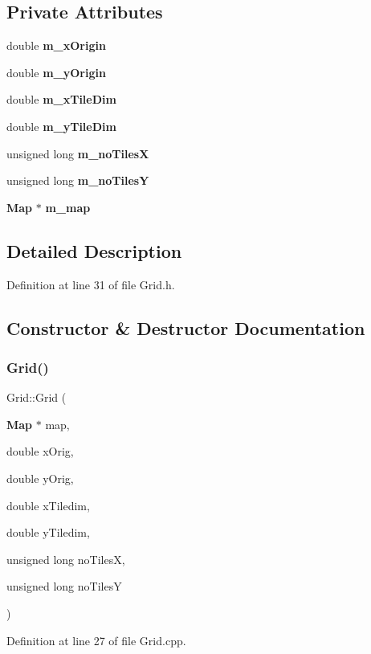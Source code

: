 \subsection*{Private Attributes}
\begin{DoxyCompactItemize}
\item 
double \textbf{ m\+\_\+x\+Origin}
\item 
double \textbf{ m\+\_\+y\+Origin}
\item 
double \textbf{ m\+\_\+x\+Tile\+Dim}
\item 
double \textbf{ m\+\_\+y\+Tile\+Dim}
\item 
unsigned long \textbf{ m\+\_\+no\+TilesX}
\item 
unsigned long \textbf{ m\+\_\+no\+TilesY}
\item 
\textbf{ Map} $\ast$ \textbf{ m\+\_\+map}
\end{DoxyCompactItemize}


\subsection{Detailed Description}


Definition at line 31 of file Grid.\+h.



\subsection{Constructor \& Destructor Documentation}
\mbox{\label{class_grid_a6d2d20a01e2e0d96d19605d1ddb67064}} 
\subsubsection{Grid()}
{\footnotesize\ttfamily Grid\+::\+Grid (\begin{DoxyParamCaption}\item[{\textbf{ Map} $\ast$}]{map,  }\item[{double}]{x\+Orig,  }\item[{double}]{y\+Orig,  }\item[{double}]{x\+Tiledim,  }\item[{double}]{y\+Tiledim,  }\item[{unsigned long}]{no\+TilesX,  }\item[{unsigned long}]{no\+TilesY }\end{DoxyParamCaption})}



Definition at line 27 of file Grid.\+cpp.



